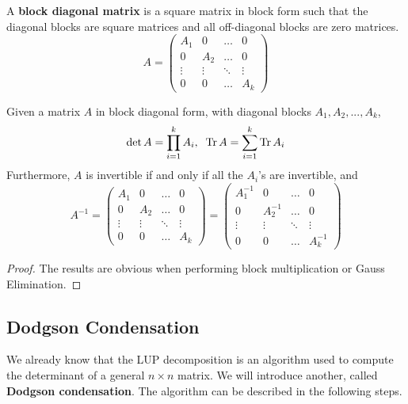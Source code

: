   \begin{definition}
  A \textbf{block diagonal matrix} is a square matrix in block form such that the diagonal blocks are square matrices and all off-diagonal blocks are zero matrices. 
  \[A = \begin{pmatrix}
  A_1&0&\ldots&0\\
  0&A_2&\ldots&0\\
  \vdots&\vdots&\ddots&\vdots\\
  0&0&\ldots&A_k
  \end{pmatrix}\]
  \end{definition}

  \begin{theorem}
  Given a matrix $A$ in block diagonal form, with diagonal blocks $A_1, A_2, ..., A_k$,
  \[\det{A} = \prod_{i=1}^k A_i, \; \; \operatorname{Tr}{A} = \sum_{i=1}^k \operatorname{Tr}{A_i}\]
  Furthermore, $A$ is invertible if and only if all the $A_i$'s are invertible, and 
  \[A^{-1} = \begin{pmatrix}
  A_1&0&\ldots&0\\
  0&A_2&\ldots&0\\
  \vdots&\vdots&\ddots&\vdots\\
  0&0&\ldots&A_k
  \end{pmatrix} = \begin{pmatrix}
  A_1^{-1}&0&\ldots&0\\
  0&A_2^{-1}&\ldots&0\\
  \vdots&\vdots&\ddots&\vdots\\
  0&0&\ldots&A_k^{-1}
  \end{pmatrix}\]
  \end{theorem}
  \begin{proof}
  The results are obvious when performing block multiplication or Gauss Elimination. 
  \end{proof}

\subsection{Dodgson Condensation}

  We already know that the LUP decomposition is an algorithm used to compute the determinant of a general $n \times n$ matrix. We will introduce another, called \textbf{Dodgson condensation}. The algorithm can be described in the following steps.

